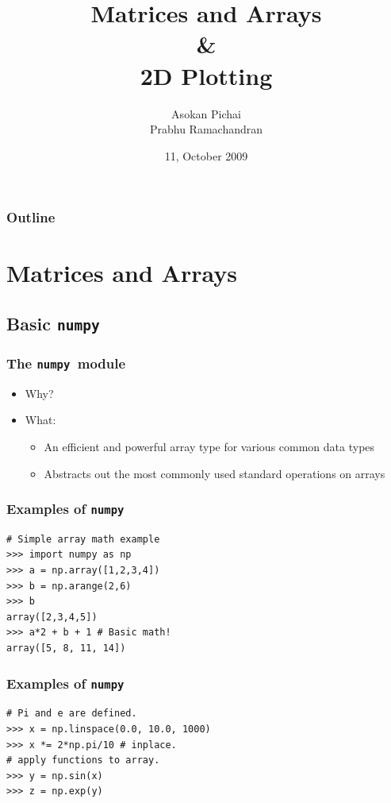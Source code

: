 \documentclass[14pt,compress]{beamer}
\title[]{Matrices and Arrays\\ \& \\2D Plotting}
\author[FOSSEE Team] {Asokan Pichai\\Prabhu Ramachandran}
\institute[IIT Bombay] {Department of Aerospace Engineering\\IIT Bombay}
\date[] {11, October 2009}
\newcounter{time}
\newcommand{\inctime}[1]{\addtocounter{time}{#1}{\tiny \thetime\ m}}
\newcommand{\typ}[1]{\lstinline{#1}}
\begin{document}
\begin{frame}
  \maketitle
\end{frame}

\begin{frame}
  \frametitle{Outline}
  \tableofcontents
\end{frame}

\section{Matrices and Arrays}

\subsection{Basic \typ{numpy} }

\newcommand{\num}{\texttt{numpy}}

\begin{frame}
  \frametitle{The \num\ module}
  \begin{itemize}
      \item Why?
  \item What:
    \begin{itemize}
    \item An efficient and powerful array type for various common data
      types
    \item Abstracts out the most commonly used standard operations on
      arrays
    \end{itemize}
  \end{itemize}
\end{frame}

\begin{frame}[fragile]
  \frametitle{Examples of \num}
\begin{lstlisting}
# Simple array math example
>>> import numpy as np
>>> a = np.array([1,2,3,4])
>>> b = np.arange(2,6)
>>> b
array([2,3,4,5])
>>> a*2 + b + 1 # Basic math!
array([5, 8, 11, 14])
\end{lstlisting}
\end{frame}

\begin{frame}[fragile]
  \frametitle{Examples of \num}
\begin{lstlisting}
# Pi and e are defined.
>>> x = np.linspace(0.0, 10.0, 1000)
>>> x *= 2*np.pi/10 # inplace.
# apply functions to array.
>>> y = np.sin(x)
>>> z = np.exp(y)
\end{lstlisting}
\inctime{5}
\end{frame}
\end{document}
